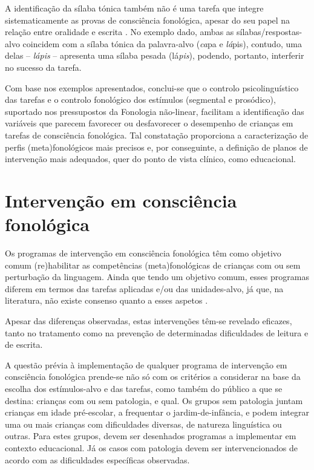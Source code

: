 \documentclass[output=paper,colorlinks,citecolor=brown,booklanguage=portuguese]{langscibook}
\begin{document}
A identificação da sílaba tónica também não é uma tarefa que integre sistematicamente as provas de consciência fonológica, apesar do seu papel na relação entre oralidade e escrita \citep{Miranda2017}. No exemplo dado, ambas as sílabas/respostas-alvo coincidem com a sílaba tónica da palavra-alvo (\emph{ca}pa e \emph{lá}pis), contudo, uma delas -- \emph{lápis} -- apresenta uma sílaba pesada (lá\emph{pis}), podendo, portanto, interferir no sucesso da tarefa. 

Com base nos exemplos apresentados, conclui-se que o controlo psicolinguístico das tarefas e o controlo fonológico dos estímulos (segmental e prosódico), suportado nos pressupostos da Fonologia não-linear, facilitam a identificação das variáveis que parecem favorecer ou desfavorecer o desempenho de crianças em tarefas de consciência fonológica. Tal constatação proporciona a caracterização de perfis (meta)fonológicos mais precisos e, por conseguinte, a definição de planos de intervenção mais adequados, quer do ponto de vista clínico, como educacional. 

\section{Intervenção em consciência fonológica}\label{sec:cap10sec3}
Os programas de intervenção em consciência fonológica têm como objetivo comum (re)habilitar as competências (meta)fonológicas de crianças com ou sem perturbação da linguagem. Ainda que tendo um objetivo comum, esses programas diferem em termos das tarefas aplicadas e/ou das unidades-alvo, já que, na literatura, não existe consenso quanto a esses aspetos \citep{Carvalho2012}.

Apesar das diferenças observadas, estas intervenções têm-se revelado eficazes, tanto no tratamento como na prevenção de determinadas dificuldades de leitura e de escrita.

A questão prévia à implementação de qualquer programa de intervenção em consciência fonológica prende-se não só com os critérios a considerar na base da escolha dos estímulos-alvo e das tarefas, como também do público a que se destina: crianças com ou sem patologia, e qual. Os grupos sem patologia juntam crianças em idade pré-escolar, a frequentar o jardim-de-infância, e podem integrar uma ou mais crianças com dificuldades diversas, de natureza linguística ou outras. Para estes grupos, devem ser desenhados programas a implementar em contexto educacional. Já os casos com patologia devem ser intervencionados de acordo com as dificuldades específicas observadas.
\end{document}
